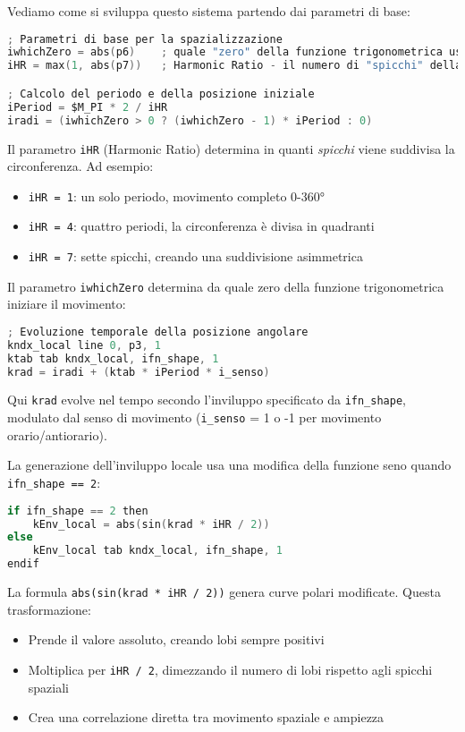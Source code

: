 Vediamo come si sviluppa questo sistema partendo dai parametri di base:

\begin{lstlisting}[language=C]
; Parametri di base per la spazializzazione
iwhichZero = abs(p6)    ; quale "zero" della funzione trigonometrica usare
iHR = max(1, abs(p7))   ; Harmonic Ratio - il numero di "spicchi" della circonferenza

; Calcolo del periodo e della posizione iniziale
iPeriod = $M_PI * 2 / iHR
iradi = (iwhichZero > 0 ? (iwhichZero - 1) * iPeriod : 0)
\end{lstlisting}

Il parametro \texttt{iHR} (Harmonic Ratio) determina in quanti \textit{spicchi} viene suddivisa la circonferenza. Ad esempio:
\begin{itemize}
    \item \texttt{iHR = 1}: un solo periodo, movimento completo 0-360°
    \item \texttt{iHR = 4}: quattro periodi, la circonferenza è divisa in quadranti
    \item \texttt{iHR = 7}: sette spicchi, creando una suddivisione asimmetrica
\end{itemize}

Il parametro \texttt{iwhichZero} determina da quale zero della funzione trigonometrica iniziare il movimento:

\begin{lstlisting}[language=C]
; Evoluzione temporale della posizione angolare
kndx_local line 0, p3, 1
ktab tab kndx_local, ifn_shape, 1
krad = iradi + (ktab * iPeriod * i_senso)
\end{lstlisting}

Qui \texttt{krad} evolve nel tempo secondo l'inviluppo specificato da \texttt{ifn\_shape}, modulato dal senso di movimento (\texttt{i\_senso} = 1 o -1 per movimento orario/antiorario).

La generazione dell'inviluppo locale usa una modifica della funzione seno quando \texttt{ifn\_shape == 2}:

\begin{lstlisting}[language=C]
if ifn_shape == 2 then
    kEnv_local = abs(sin(krad * iHR / 2))
else
    kEnv_local tab kndx_local, ifn_shape, 1
endif
\end{lstlisting}

La formula \texttt{abs(sin(krad * iHR / 2))} genera curve polari modificate. Questa trasformazione:
\begin{itemize}
    \item Prende il valore assoluto, creando lobi sempre positivi
    \item Moltiplica per \texttt{iHR / 2}, dimezzando il numero di lobi rispetto agli spicchi spaziali
    \item Crea una correlazione diretta tra movimento spaziale e ampiezza
\end{itemize}

